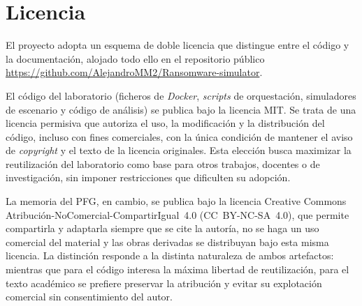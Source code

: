 \documentclass[../main.tex]{subfiles}
\begin{document}
\section{Licencia}

El proyecto adopta un esquema de doble licencia que distingue entre el código
y la documentación, alojado todo ello en el repositorio público
\url{https://github.com/AlejandroMM2/Ransomware-simulator}.

El código del laboratorio (ficheros de \emph{Docker}, \emph{scripts} de
orquestación, simuladores de escenario y código de análisis) se publica bajo
la licencia MIT. Se trata de una licencia permisiva que autoriza el uso, la
modificación y la distribución del código, incluso con fines comerciales, con
la única condición de mantener el aviso de \emph{copyright} y el texto de la
licencia originales. Esta elección busca maximizar la reutilización del
laboratorio como base para otros trabajos, docentes o de investigación, sin
imponer restricciones que dificulten su adopción.

La memoria del PFG, en cambio, se publica bajo la licencia Creative Commons
Atribución-NoComercial-CompartirIgual~4.0 (CC~BY-NC-SA~4.0), que permite
compartirla y adaptarla siempre que se cite la autoría, no se haga un uso
comercial del material y las obras derivadas se distribuyan bajo esta misma
licencia. La distinción responde a la distinta naturaleza de ambos
artefactos: mientras que para el código interesa la máxima libertad de
reutilización, para el texto académico se prefiere preservar la atribución y
evitar su explotación comercial sin consentimiento del autor.
\end{document}
